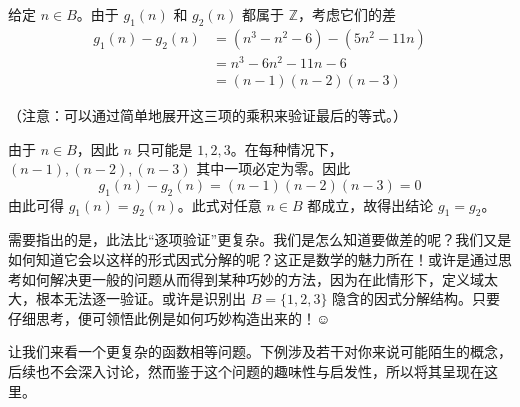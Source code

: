 给定 $n \in B$。由于 $g_1(n)$ 和 $g_2(n)$ 都属于 $\mathbb{Z}$，考虑它们的差
\begin{align*}
    g_1(n) - g_2(n) &= (n^3 - n^2 - 6) - (5n^2 - 11n) \\
    &= n^3 - 6n^2 - 11n - 6 \\
    &= (n - 1)(n - 2)(n - 3)
\end{align*}

（注意：可以通过简单地展开这三项的乘积来验证最后的等式。）

由于 $n \in B$，因此 $n$ 只可能是 $1,2,3$。在每种情况下，$(n - 1), (n - 2), (n - 3)$ 其中一项必定为零。因此
\[g_1(n) - g_2(n) = (n - 1)(n - 2)(n - 3) = 0\]
由此可得 $g_1(n) = g_2(n)$。此式对任意 $n \in B$ 都成立，故得出结论 $g_1 = g_2$。

需要指出的是，此法比``逐项验证''更复杂。我们是怎么知道要做差的呢？我们又是如何知道它会以这样的形式因式分解的呢？这正是数学的魅力所在！或许是通过思考如何解决更一般的问题从而得到某种巧妙的方法，因为在此情形下，定义域太大，根本无法逐一验证。或许是识别出 $B = \{1, 2, 3\}$ 隐含的因式分解结构。只要仔细思考，便可领悟此例是如何巧妙构造出来的！$\smiley{}$

让我们来看一个更复杂的函数相等问题。下例涉及若干对你来说可能陌生的概念，后续也不会深入讨论，然而鉴于这个问题的趣味性与启发性，所以将其呈现在这里。\\

